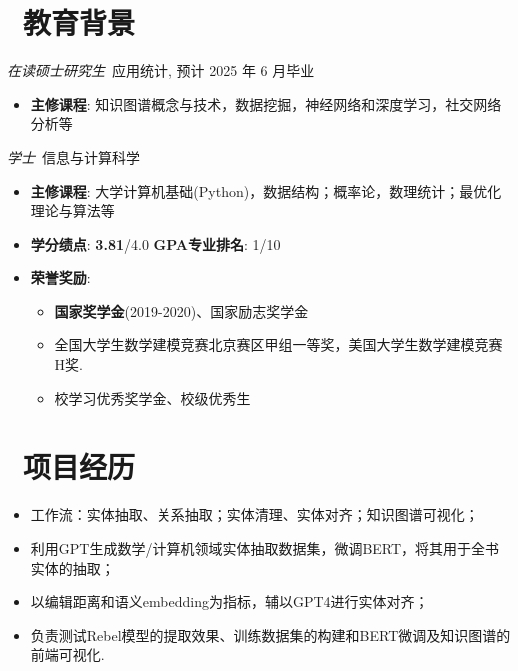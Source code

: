 \documentclass{resume}
\begin{document}



\section{\faGraduationCap\  教育背景}
\textit{在读硕士研究生}\ 应用统计, 预计 2025 年 6 月毕业
\begin{itemize}
	\item \textbf{主修课程}: 知识图谱概念与技术，数据挖掘，神经网络和深度学习，社交网络分析等
\end{itemize}

\textit{学士}\ 信息与计算科学
\begin{itemize}
	\item \textbf{主修课程}: 大学计算机基础(Python)，数据结构；概率论，数理统计；最优化理论与算法等
	\item \textbf{学分绩点}: \textbf{3.81}/4.0 \quad \textbf{GPA专业排名}: 1/10
	\item \textbf{荣誉奖励}:
	      \begin{itemize}[label=$\ast$]
		      \item \textbf{国家奖学金}(2019-2020)、国家励志奖学金
		      \item 全国大学生数学建模竞赛北京赛区甲组一等奖，美国大学生数学建模竞赛H奖.
		      \item 校学习优秀奖学金、校级优秀生
	      \end{itemize}
\end{itemize}

\section{\faUsers\ 项目经历}
\begin{itemize}
	\item 工作流：实体抽取、关系抽取；实体清理、实体对齐；知识图谱可视化；
	\item 利用GPT生成数学/计算机领域实体抽取数据集，微调BERT，将其用于全书实体的抽取；
	\item 以编辑距离和语义embedding为指标，辅以GPT4进行实体对齐；
	\item 负责测试Rebel模型的提取效果、训练数据集的构建和BERT微调及知识图谱的前端可视化.
\end{itemize}
\end{document}
